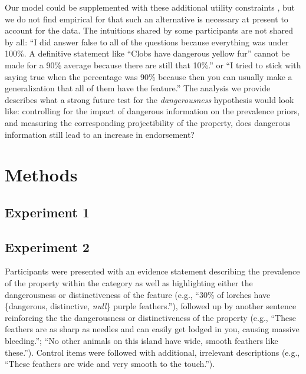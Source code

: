 \documentclass[floatsintext, 11pt, doc]{apa6}
\begin{document}
Our model could be supplemented with these additional utility constraints \cite{Goodman2016, Yoon2016}, but we do not find empirical for that such an alternative is necessary at present to account for the data.
The intuitions shared by some participants are not shared by all: ``I did answer false to all of the questions because everything was under 100\%. A definitive statement like ``Clobs have dangerous yellow fur'' cannot be made for a 90\% average because there are still that 10\%.'' or ``I tried to stick with saying true when the percentage was 90\% because then you can usually make a generalization that all of them have the feature.''
The analysis we provide describes what a strong future test for the \emph{dangerousness} hypothesis would look like: controlling for the impact of dangerous information on the prevalence priors, and measuring the corresponding projectibility of the property, does dangerous information still lead to an increase in endorsement?



\section{Methods}

\subsection{Experiment 1}

\subsection{Experiment 2}

Participants were presented with an evidence statement describing the prevalence of the property within the category as well as highlighting either the dangerousness or distinctiveness of the feature (e.g., ``30\% of lorches have \{dangerous, distinctive, \emph{null}\} purple feathers.''), followed up by another sentence reinforcing the the dangerousness or distinctiveness of the property (e.g., ``These feathers are as sharp as needles and can easily get lodged in you, causing massive bleeding.''; ``No other animals on this island have wide, smooth feathers like these.''). Control items were followed with additional, irrelevant descriptions (e.g., ``These feathers are wide and very smooth to the touch.''). 
\end{document}
